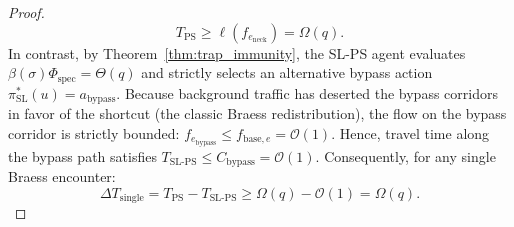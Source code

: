 \documentclass[11pt,a4paper]{article}
\begin{document}
\begin{proof}
\begin{equation}
T_{\text{PS}} \ge \ell(f_{e_{\text{neck}}}) = \Omega(q).
\end{equation}
In contrast, by Theorem~\ref{thm:trap_immunity}, the SL-PS agent evaluates $\beta(\sigma) \Phi_{\text{spec}} = \Theta(q)$ and strictly selects an alternative bypass action $\pi_{\text{SL}}^*(u) = a_{\text{bypass}}$. Because background traffic has deserted the bypass corridors in favor of the shortcut (the classic Braess redistribution), the flow on the bypass corridor is strictly bounded: $f_{e_{\text{bypass}}} \le f_{\text{base}, e} = \mathcal{O}(1)$. Hence, travel time along the bypass path satisfies $T_{\text{SL-PS}} \le C_{\text{bypass}} = \mathcal{O}(1)$. Consequently, for any single Braess encounter:
\begin{equation}
\Delta T_{\text{single}} = T_{\text{PS}} - T_{\text{SL-PS}} \ge \Omega(q) - \mathcal{O}(1) = \Omega(q).
\end{equation}


\end{proof}
\end{document}
